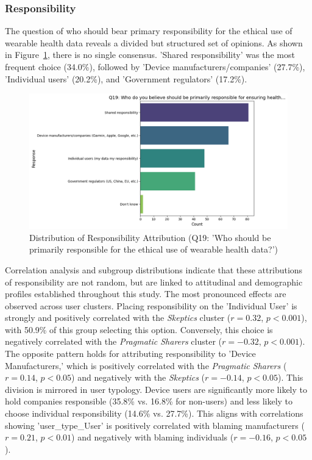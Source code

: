 	\subsubsection{Responsibility}
		The question of who should bear primary responsibility for the ethical use of wearable health data reveals a divided but structured set of opinions. As shown in Figure~\ref{fig:responsibility_q19}, there is no single consensus. 'Shared responsibility' was the most frequent choice (34.0\%), followed by 'Device manufacturers/companies' (27.7\%), 'Individual users' (20.2\%), and 'Government regulators' (17.2\%).
		\begin{figure}[ht]\centering
			\includegraphics[width=1.0\textwidth, height=0.55\textheight, keepaspectratio]{figures/img/subgroup_ana/Q19_overall_dist.png}
			\caption{Distribution of Responsibility Attribution (Q19: 'Who should be primarily responsible for the ethical use of wearable health data?')}
			\label{fig:responsibility_q19}
		\end{figure}
		Correlation analysis and subgroup distributions indicate that these attributions of responsibility are not random, but are linked to attitudinal and demographic profiles established throughout this study. The most pronounced effects are observed across user clusters. Placing responsibility on the 'Individual User' is strongly and positively correlated with the \textit{Skeptics} cluster ($r = 0.32$, $p < 0.001$), with 50.9\% of this group selecting this option. Conversely, this choice is negatively correlated with the \textit{Pragmatic Sharers} cluster ($r = -0.32$, $p < 0.001$). The opposite pattern holds for attributing responsibility to 'Device Manufacturers,' which is positively correlated with the \textit{Pragmatic Sharers} ($r = 0.14$, $p < 0.05$) and negatively with the \textit{Skeptics} ($r = -0.14$, $p < 0.05$).
		This division is mirrored in user typology. Device users are significantly more likely to hold companies responsible (35.8\% vs. 16.8\% for non-users) and less likely to choose individual responsibility (14.6\% vs. 27.7\%). This aligns with correlations showing 'user\_type\_User' is positively correlated with blaming manufacturers ($r = 0.21$, $p < 0.01$) and negatively with blaming individuals ($r = -0.16$, $p < 0.05$).
